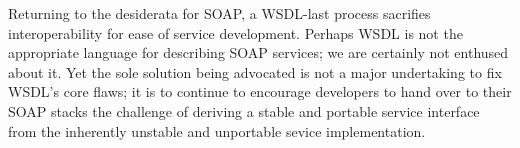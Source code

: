 Returning to the desiderata for SOAP, a WSDL-last process sacrifies
interoperability for ease of service development. Perhaps WSDL is not
the appropriate language for describing SOAP services; we are certainly
not enthused about it. Yet the sole solution being advocated is not a
major undertaking to fix WSDL's core flaws; it is to continue to
encourage developers to hand over to their SOAP stacks the challenge of
deriving a stable and portable service interface from the inherently
unstable and unportable sevice implementation.
